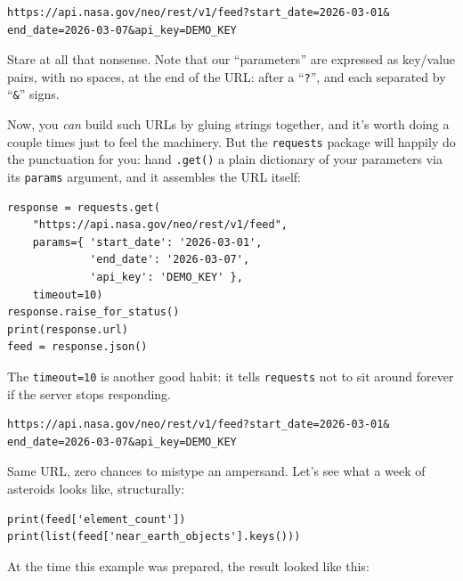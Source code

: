 \normalsize
\vspace{-.5in}
\begin{Verbatim}[fontsize=\small,samepage=true,frame=lines,framesep=3mm]
https://api.nasa.gov/neo/rest/v1/feed?start_date=2026-03-01&
end_date=2026-03-07&api_key=DEMO_KEY
\end{Verbatim}

Stare at all that nonsense. Note that our ``parameters'' are expressed as
key/value pairs, with no spaces, at the end of the URL: after a ``\texttt{?}'',
and each separated by ``\texttt{\&}'' signs.


Now, you \textit{can} build such URLs by gluing strings together, and it's
worth doing a couple times just to feel the machinery. But the
\texttt{requests} package will happily do the punctuation for you: hand
\texttt{.get()} a plain dictionary of your parameters via its \texttt{params}
argument, and it assembles the URL itself:

\begin{Verbatim}[fontsize=\small,samepage=true,frame=single,framesep=3mm]
response = requests.get(
    "https://api.nasa.gov/neo/rest/v1/feed",
    params={ 'start_date': '2026-03-01',
             'end_date': '2026-03-07',
             'api_key': 'DEMO_KEY' },
    timeout=10)
response.raise_for_status()
print(response.url)
feed = response.json()
\end{Verbatim}

The \texttt{timeout=10} is another good habit: it tells
\texttt{requests} not to sit around forever if the server stops responding.

\begin{Verbatim}[fontsize=\scriptsize,samepage=true,frame=leftline,framesep=5mm,framerule=1mm]
https://api.nasa.gov/neo/rest/v1/feed?start_date=2026-03-01&
end_date=2026-03-07&api_key=DEMO_KEY
\end{Verbatim}

Same URL, zero chances to mistype an ampersand. Let's see what a week of
asteroids looks like, structurally:

\begin{Verbatim}[fontsize=\small,samepage=true,frame=single,framesep=3mm]
print(feed['element_count'])
print(list(feed['near_earth_objects'].keys()))
\end{Verbatim}
\vspace{-.2in}

At the time this example was prepared, the result looked like this:

